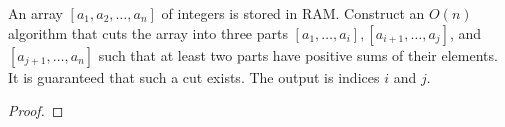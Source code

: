 \begin{prob}
An array $\left[a_1, a_2, \ldots, a_n\right]$ of integers is stored in RAM. Construct an $O(n)$ algorithm that cuts the array into three parts $\left[a_1, \ldots, a_i\right],\left[a_{i+1}, \ldots, a_j\right]$, and $\left[a_{j+1}, \ldots, a_n\right]$ such that at least two parts have positive sums of their elements. It is guaranteed that such a cut exists. The output is indices $i$ and $j$.
\end{prob}

\begin{proof}
\end{proof}

\iffalse
Сперва за $O(n)$ мы можем проверить положительность $a_1, a_1 + a_2, \ldots, a_1 + \ldots + a_{n-2}$, и положительность $a_n, a_n + a_{n-1}, \ldots, a_n + \ldots + a_3$, заметим, что хотя бы одна из всех этих сумм положительна (иначе у нас нет положительного участка с концом в $a_1$ или $a_n$, но тогда каким бы ни было деление на 3 множества, хотя бы 2 из них будут отрицательными, что противоречит условию)
Рассмотрим первую встретившуюся такую сумму, без ограничения общности предположим что это $a_1 + \ldots + a_k$, если средин сумм $a_n, a_n + a_{n-1}, \ldots, a_n + \ldots + a_{k+1}$ нет положительных, то рассмотрим участки $a_{k+1}, a_{k+1} + a_{k+2}, \ldots$ среди них должен быть положительный, иначе
\fi